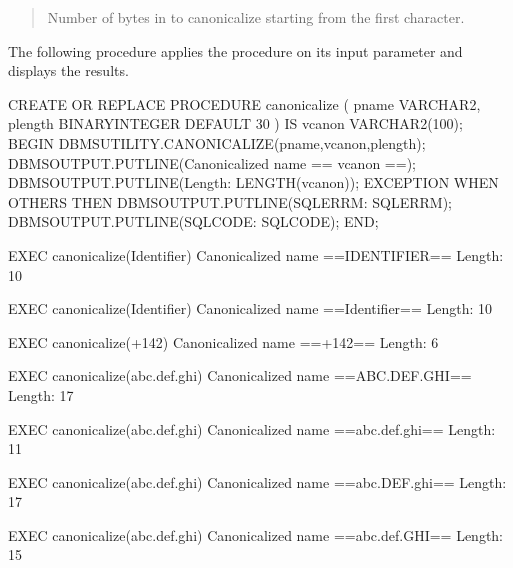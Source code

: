 \documentclass[letterpaper,10pt,english,openany,oneside]{sphinxmanual}
\begin{document}
\begin{quote}

Number of bytes in  to canonicalize starting from the first
character.
\end{quote}


The following procedure applies the  procedure on its input
parameter and displays the results.

%
\begin{sphinxVerbatim}[commandchars=\\\{\}]
CREATE OR REPLACE PROCEDURE canonicalize (
    p\PYGZus{}name      VARCHAR2,
    p\PYGZus{}length    BINARY\PYGZus{}INTEGER DEFAULT 30
)
IS
    v\PYGZus{}canon     VARCHAR2(100);
BEGIN
    DBMS\PYGZus{}UTILITY.CANONICALIZE(p\PYGZus{}name,v\PYGZus{}canon,p\PYGZus{}length);
    DBMS\PYGZus{}OUTPUT.PUT\PYGZus{}LINE(\PYGZsq{}Canonicalized name ==\PYGZgt{}\PYGZsq{} \textbar{}\textbar{} v\PYGZus{}canon \textbar{}\textbar{} \PYGZsq{}\PYGZlt{}==\PYGZsq{});
    DBMS\PYGZus{}OUTPUT.PUT\PYGZus{}LINE(\PYGZsq{}Length: \PYGZsq{} \textbar{}\textbar{} LENGTH(v\PYGZus{}canon));
EXCEPTION
    WHEN OTHERS THEN
        DBMS\PYGZus{}OUTPUT.PUT\PYGZus{}LINE(\PYGZsq{}SQLERRM: \PYGZsq{} \textbar{}\textbar{} SQLERRM);
        DBMS\PYGZus{}OUTPUT.PUT\PYGZus{}LINE(\PYGZsq{}SQLCODE: \PYGZsq{} \textbar{}\textbar{} SQLCODE);
END;

EXEC canonicalize(\PYGZsq{}Identifier\PYGZsq{})
Canonicalized name ==\PYGZgt{}IDENTIFIER\PYGZlt{}==
Length: 10

EXEC canonicalize(\PYGZsq{}\PYGZdq{}Identifier\PYGZdq{}\PYGZsq{})
Canonicalized name ==\PYGZgt{}Identifier\PYGZlt{}==
Length: 10

EXEC canonicalize(\PYGZsq{}\PYGZdq{}\PYGZus{}+142\PYGZpc{}\PYGZdq{}\PYGZsq{})
Canonicalized name ==\PYGZgt{}\PYGZus{}+142\PYGZpc{}\PYGZlt{}==
Length: 6

EXEC canonicalize(\PYGZsq{}abc.def.ghi\PYGZsq{})
Canonicalized name ==\PYGZgt{}\PYGZdq{}ABC\PYGZdq{}.\PYGZdq{}DEF\PYGZdq{}.\PYGZdq{}GHI\PYGZdq{}\PYGZlt{}==
Length: 17

EXEC canonicalize(\PYGZsq{}\PYGZdq{}abc.def.ghi\PYGZdq{}\PYGZsq{})
Canonicalized name ==\PYGZgt{}abc.def.ghi\PYGZlt{}==
Length: 11

EXEC canonicalize(\PYGZsq{}\PYGZdq{}abc\PYGZdq{}.def.\PYGZdq{}ghi\PYGZdq{}\PYGZsq{})
Canonicalized name ==\PYGZgt{}\PYGZdq{}abc\PYGZdq{}.\PYGZdq{}DEF\PYGZdq{}.\PYGZdq{}ghi\PYGZdq{}\PYGZlt{}==
Length: 17

EXEC canonicalize(\PYGZsq{}\PYGZdq{}abc.def\PYGZdq{}.ghi\PYGZsq{})
Canonicalized name ==\PYGZgt{}\PYGZdq{}abc.def\PYGZdq{}.\PYGZdq{}GHI\PYGZdq{}\PYGZlt{}==
Length: 15
\end{sphinxVerbatim}
\end{document}
